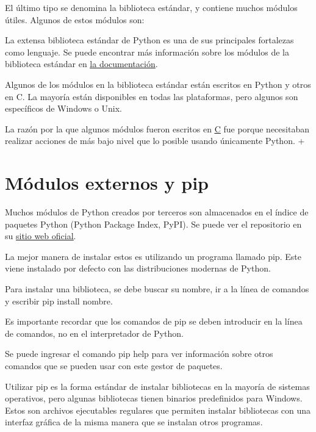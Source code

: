 \documentclass{report}
\newcommand{\link}[2]{\href{#1}{\underline{#2}}}
\begin{document}
El último tipo se denomina la biblioteca estándar, y contiene muchos módulos útiles. Algunos de estos módulos son:


La extensa biblioteca estándar de Python es una de sus principales fortalezas como lenguaje. Se puede encontrar más información sobre los módulos de la biblioteca estándar en \link{https://docs.python.org/3/library/index.html}{la documentación}.\smallskip

Algunos de los módulos en la biblioteca estándar están escritos en Python y otros en C. La mayoría están disponibles en todas las plataformas, pero algunos son específicos de Windows o Unix.\smallskip

La razón por la que algunos módulos fueron escritos en \link{https://es.wikipedia.org/wiki/C_(lenguaje_de_programaci\%C3\%B3n)}{C} fue porque necesitaban realizar acciones de más bajo nivel que lo posible usando únicamente Python.
+
\section{Módulos externos y pip}

Muchos módulos de Python creados por terceros son almacenados en el índice de paquetes Python (Python Package Index, PyPI). Se puede ver el repositorio en su \link{https://pypi.org}{sitio web oficial}.\smallskip

La mejor manera de instalar estos es utilizando un programa llamado pip. Este viene instalado por defecto con las distribuciones modernas de Python.\smallskip

Para instalar una biblioteca, se debe buscar su nombre, ir a la línea de comandos y escribir pip install nombre.


Es importante recordar que los comandos de pip se deben introducir en la línea de comandos, no en el interpretador de Python.\smallskip

Se puede ingresar el comando pip help para ver información sobre otros comandos que se pueden usar con este gestor de paquetes.


Utilizar pip es la forma estándar de instalar bibliotecas en la mayoría de sistemas operativos, pero algunas bibliotecas tienen binarios predefinidos para Windows. Estos son archivos ejecutables regulares que permiten instalar bibliotecas con una interfaz gráfica de la misma manera que se instalan otros programas.
\end{document}
